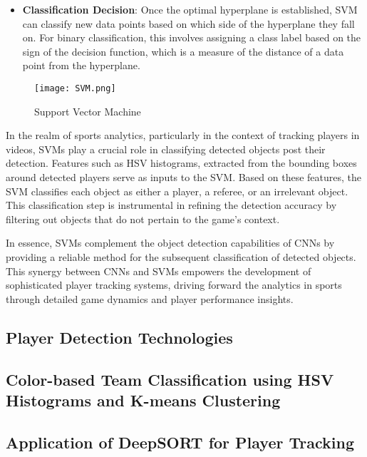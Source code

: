 \documentclass[12pt, letterpaper]{article}
\begin{document}
{\begin{spacing}{1.2}
\begin{itemize}
    \item \textbf{Classification Decision}: Once the optimal hyperplane is established, SVM can classify new data points based on which side of the hyperplane they fall on. For binary classification, this involves assigning a class label based on the sign of the decision function, which is a measure of the distance of a data point from the hyperplane.
\end{itemize}

\begin{figure}[htbp]
\centering
\texttt{[image: SVM.png]}
\captionsetup{font=large}
\caption{Support Vector Machine}
\label{fig:SVM}
\end{figure}

In the realm of sports analytics, particularly in the context of tracking players in videos, SVMs play a crucial role in classifying detected objects post their detection. Features such as HSV histograms, extracted from the bounding boxes around detected players serve as inputs to the SVM. Based on these features, the SVM classifies each object as either a player, a referee, or an irrelevant object. This classification step is instrumental in refining the detection accuracy by filtering out objects that do not pertain to the game's context.

In essence, SVMs complement the object detection capabilities of CNNs by providing a reliable method for the subsequent classification of detected objects. This synergy between CNNs and SVMs empowers the development of sophisticated player tracking systems, driving forward the analytics in sports through detailed game dynamics and player performance insights.

\end{spacing}
}

{
\setlength{\parskip}{0.3cm}
\subsection{Player Detection Technologies}
\begin{spacing}{1.2}
\end{spacing}
}

\subsection{Color-based Team Classification using HSV Histograms and K-means Clustering}
\subsection{Application of DeepSORT for Player Tracking}
\end{document}
